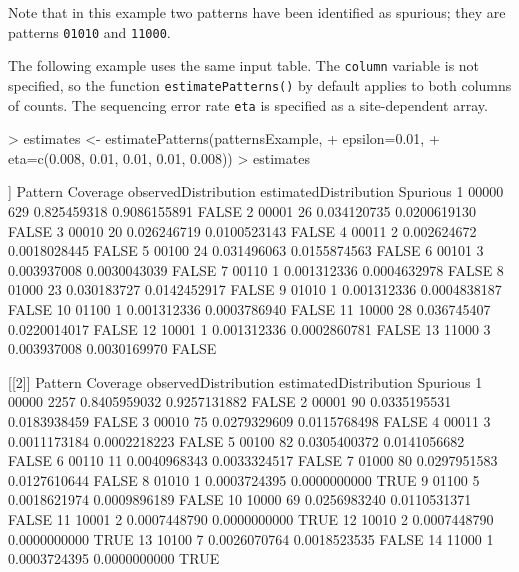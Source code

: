 \documentclass[12pt]{article}
\begin{document}
Note that in this example two patterns have been identified as spurious; they are patterns {\tt 01010} and {\tt 11000}.

The following example uses the same input table. 
The {\tt column} variable is not specified, 
so the function {\tt estimatePatterns()} by default applies to both columns of counts.
The sequencing error rate {\tt eta} is specified as a site-dependent array. 

\begin{Schunk}
\begin{Sinput}
> estimates <- estimatePatterns(patternsExample,
+                  epsilon=0.01, 
+                  eta=c(0.008, 0.01, 0.01, 0.01, 0.008))
> estimates
\end{Sinput}
\begin{Soutput}
[[1]]
   Pattern Coverage observedDistribution estimatedDistribution Spurious
1    00000      629          0.825459318          0.9086155891    FALSE
2    00001       26          0.034120735          0.0200619130    FALSE
3    00010       20          0.026246719          0.0100523143    FALSE
4    00011        2          0.002624672          0.0018028445    FALSE
5    00100       24          0.031496063          0.0155874563    FALSE
6    00101        3          0.003937008          0.0030043039    FALSE
7    00110        1          0.001312336          0.0004632978    FALSE
8    01000       23          0.030183727          0.0142452917    FALSE
9    01010        1          0.001312336          0.0004838187    FALSE
10   01100        1          0.001312336          0.0003786940    FALSE
11   10000       28          0.036745407          0.0220014017    FALSE
12   10001        1          0.001312336          0.0002860781    FALSE
13   11000        3          0.003937008          0.0030169970    FALSE

[[2]]
   Pattern Coverage observedDistribution estimatedDistribution Spurious
1    00000     2257         0.8405959032          0.9257131882    FALSE
2    00001       90         0.0335195531          0.0183938459    FALSE
3    00010       75         0.0279329609          0.0115768498    FALSE
4    00011        3         0.0011173184          0.0002218223    FALSE
5    00100       82         0.0305400372          0.0141056682    FALSE
6    00110       11         0.0040968343          0.0033324517    FALSE
7    01000       80         0.0297951583          0.0127610644    FALSE
8    01010        1         0.0003724395          0.0000000000     TRUE
9    01100        5         0.0018621974          0.0009896189    FALSE
10   10000       69         0.0256983240          0.0110531371    FALSE
11   10001        2         0.0007448790          0.0000000000     TRUE
12   10010        2         0.0007448790          0.0000000000     TRUE
13   10100        7         0.0026070764          0.0018523535    FALSE
14   11000        1         0.0003724395          0.0000000000     TRUE
\end{Soutput}
\end{Schunk}
\end{document}
